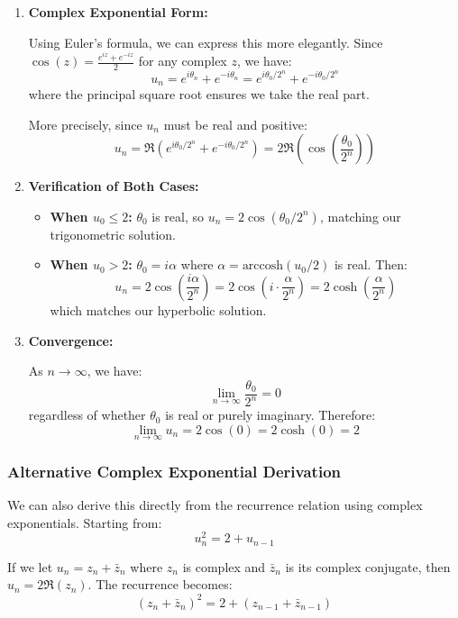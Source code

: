 \documentclass[12pt,a4paper]{article}
\theoremstyle{definition}
\begin{document}
\begin{enumerate}[label=\arabic*.]
    \item \textbf{Complex Exponential Form:}
    
    Using Euler's formula, we can express this more elegantly. Since $\cos(z) = \frac{e^{iz} + e^{-iz}}{2}$ for any complex $z$, we have:
    \[
    u_n = e^{i\theta_n} + e^{-i\theta_n} = e^{i\theta_0/2^n} + e^{-i\theta_0/2^n}
    \]
    where the principal square root ensures we take the real part.
    
    More precisely, since $u_n$ must be real and positive:
    \[
    u_n = \Re\left(e^{i\theta_0/2^n} + e^{-i\theta_0/2^n}\right) = 2\Re\left(\cos\left(\frac{\theta_0}{2^n}\right)\right)
    \]
    
    \item \textbf{Verification of Both Cases:}
    
    \begin{itemize}
        \item \textbf{When $u_0 \le 2$:} $\theta_0$ is real, so $u_n = 2\cos(\theta_0/2^n)$, matching our trigonometric solution.
        
        \item \textbf{When $u_0 > 2$:} $\theta_0 = i\alpha$ where $\alpha = \text{arccosh}(u_0/2)$ is real. Then:
        \[
        u_n = 2\cos\left(\frac{i\alpha}{2^n}\right) = 2\cos\left(i\cdot\frac{\alpha}{2^n}\right) = 2\cosh\left(\frac{\alpha}{2^n}\right)
        \]
        which matches our hyperbolic solution.
    \end{itemize}
    
    \item \textbf{Convergence:}
    
    As $n \to \infty$, we have:
    \[
    \lim_{n \to \infty} \frac{\theta_0}{2^n} = 0
    \]
    regardless of whether $\theta_0$ is real or purely imaginary. Therefore:
    \[
    \lim_{n \to \infty} u_n = 2\cos(0) = 2\cosh(0) = 2
    \]
\end{enumerate}

\subsubsection{Alternative Complex Exponential Derivation}

We can also derive this directly from the recurrence relation using complex exponentials. Starting from:
\[
u_n^2 = 2 + u_{n-1}
\]

If we let $u_n = z_n + \bar{z}_n$ where $z_n$ is complex and $\bar{z}_n$ is its complex conjugate, then $u_n = 2\Re(z_n)$. The recurrence becomes:
\[
(z_n + \bar{z}_n)^2 = 2 + (z_{n-1} + \bar{z}_{n-1})
\]
\end{document}
